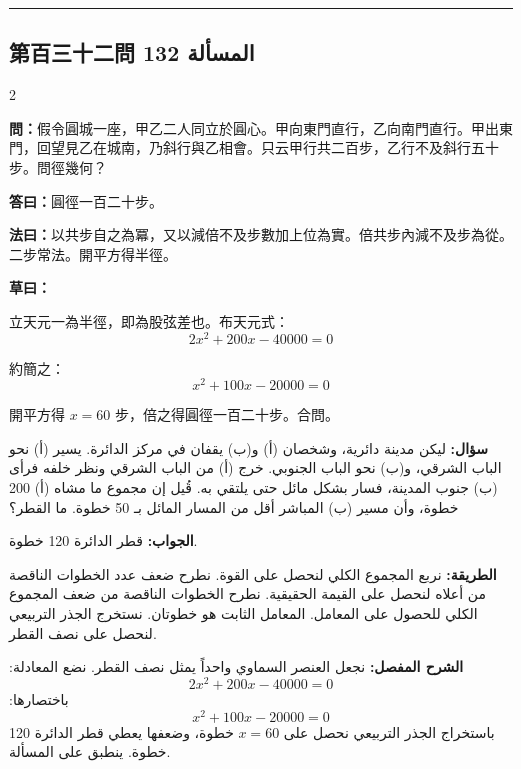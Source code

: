 \documentclass[11pt,a4paper]{article}
\newcommand{\ar}[1]{\arabicfont\beginR #1\endR}
\newcommand{\arb}[1]{\textbf{\arabicfont\beginR #1\endR}}
\newcommand{\longline}{\noindent\rule{\textwidth}{0.4pt}}
\newcommand{\arnote}[1]{\textcolor{arabicblue}{\ar{#1}}}
\newcommand{\wen}[1]{\par\noindent\textbf{\textcolor{probcolor}{問：}}{#1}\par}
\newcommand{\da}[1]{\par\noindent\textbf{\textcolor{anscolor}{答曰：}}{#1}\par}
\newcommand{\fayue}[1]{\par\noindent\textbf{\textcolor{methodcolor}{法曰：}}{#1}\par}
\newcommand{\caoyue}[1]{\par\noindent\textbf{草曰：}{#1}\par}
\newcommand{\arwen}[1]{\par\noindent\arb{سؤال: }\arnote{#1}\par}
\newcommand{\arjwb}[1]{\par\noindent\arb{الجواب: }\arnote{#1}\par}
\newcommand{\arqwd}[1]{\par\noindent\arb{الطريقة: }\arnote{#1}\par}
\newcommand{\arshr}[1]{\par\noindent\arb{الشرح المفصل: }\arnote{#1}\par}
\begin{document}
\vspace{0.3cm}
\longline

\subsection*{第百三十二問 \hfill \ar{المسألة 132}}

\begin{paracol}{2}

\begin{leftcolumn}
\wen{假令圓城一座，甲乙二人同立於圓心。甲向東門直行，乙向南門直行。甲出東門，回望見乙在城南，乃斜行與乙相會。只云甲行共二百步，乙行不及斜行五十步。問徑幾何？}

\da{圓徑一百二十步。}

\fayue{以共步自之為冪，又以減倍不及步數加上位為實。倍共步內減不及步為從。二步常法。開平方得半徑。}

\caoyue{
立天元一為半徑，即為股弦差也。布天元式：
$$2x^2 + 200x - 40000 = 0$$

約簡之：
$$x^2 + 100x - 20000 = 0$$

開平方得 $x = 60$ 步，倍之得圓徑一百二十步。合問。}
\end{leftcolumn}

\begin{rightcolumn}
\arwen{ليكن مدينة دائرية، وشخصان (أ) و(ب) يقفان في مركز الدائرة. يسير (أ) نحو الباب الشرقي، و(ب) نحو الباب الجنوبي. خرج (أ) من الباب الشرقي ونظر خلفه فرأى (ب) جنوب المدينة، فسار بشكل مائل حتى يلتقي به. قُيل إن مجموع ما مشاه (أ) 200 خطوة، وأن مسير (ب) المباشر أقل من المسار المائل بـ 50 خطوة. ما القطر؟}

\arjwb{قطر الدائرة 120 خطوة.}

\arqwd{نربع المجموع الكلي لنحصل على القوة. نطرح ضعف عدد الخطوات الناقصة من أعلاه لنحصل على القيمة الحقيقية. نطرح الخطوات الناقصة من ضعف المجموع الكلي للحصول على المعامل. المعامل الثابت هو خطوتان. نستخرج الجذر التربيعي لنحصل على نصف القطر.}

\arshr{نجعل العنصر السماوي واحداً يمثل نصف القطر. نضع المعادلة:
$$2x^2 + 200x - 40000 = 0$$
باختصارها:
$$x^2 + 100x - 20000 = 0$$
باستخراج الجذر التربيعي نحصل على $x = 60$ خطوة، وضعفها يعطي قطر الدائرة 120 خطوة. ينطبق على المسألة.}
\end{rightcolumn}

\end{paracol}
\end{document}
